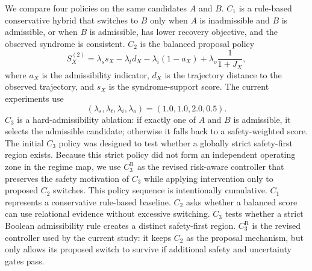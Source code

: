 \documentclass{iopjournal}
\begin{document}
We compare four policies on the same candidates $A$ and $B$. $C_1$ is a
rule-based conservative hybrid that switches to $B$ only when $A$ is inadmissible
and $B$ is admissible, or when $B$ is admissible, has lower recovery objective, and
the observed syndrome is consistent. $C_2$ is the balanced proposal policy
\begin{equation}
S_X^{(2)}
=
\lambda_s s_X
-\lambda_t d_X
-\lambda_i(1-a_X)
+\lambda_o\frac{1}{1+J_X},
\end{equation}
where $a_X$ is the admissibility indicator, $d_X$ is the trajectory distance to the
observed trajectory, and $s_X$ is the syndrome-support score. The current
experiments use
\begin{equation}
(\lambda_s,\lambda_t,\lambda_i,\lambda_o)=(1.0,1.0,2.0,0.5).
\end{equation}
$C_3$ is a hard-admissibility ablation: if exactly one of $A$ and $B$ is
admissible, it selects the admissible candidate; otherwise it falls back to a
safety-weighted score. The initial $C_3$ policy was designed to test whether a
globally strict safety-first region exists. Because this strict policy did not form
an independent operating zone in the regime map, we use $C_3^{\mathrm{R}}$ as the
revised risk-aware controller that preserves the safety motivation of $C_3$ while
applying intervention only to proposed $C_2$ switches.
This policy sequence is intentionally cumulative. $C_1$ represents a conservative
rule-based baseline. $C_2$ asks whether a balanced score can use relational
evidence without excessive switching. $C_3$ tests whether a strict Boolean
admissibility rule creates a distinct safety-first region. $C_3^{\mathrm R}$ is
the revised controller used by the current study: it keeps $C_2$ as the proposal
mechanism, but only allows its proposed switch to survive if additional safety and
uncertainty gates pass.
\end{document}
